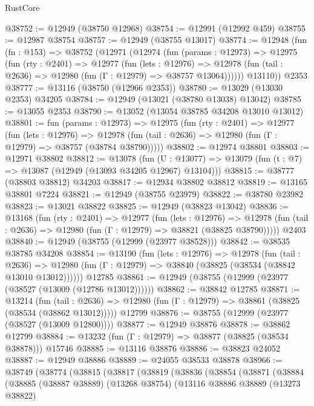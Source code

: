 \begin{lexlean}{RustCore}
\begin{coremodule}
@38752 := @12949 (@38750 @12968)
@38754 := @12991 (@12992 @459)
@38755 := @12987 @38754
@38757 := @12949 (@38755 @13017)
@38774 := @12948
    (fun (fn : @153) =>
    @38752
      (@12971
        (@12974
          (fun (params : @12973) =>
          @12975
            (fun (rty : @2401) =>
            @12977
              (fun (lets : @12976) =>
              @12978 (fun (tail : @2636) => @12980 (fun (Γ : @12979) => @38757 @13064))))))
        @13110))
    @2353
@38777 := @13116 (@38750 (@12966 @2353))
@38780 := @13029 (@13030 @2353) @34205
@38784 := @12949 (@13021 (@38780 @13038) @13042)
@38785 := @13055 @2353
@38790 := @13052 (@13054 @38785 @34208 @13010 @13012)
@38801 := fun (params : @12973) =>
  @12975
    (fun (rty : @2401) =>
    @12977
      (fun (lets : @12976) =>
      @12978 (fun (tail : @2636) => @12980 (fun (Γ : @12979) => @38757 (@38784 @38790)))))
@38802 := @12974 @38801
@38803 := @12971 @38802
@38812 := @13078
    (fun (U : @13077) => @13079 (fun (t : @7) => @13087 (@12949 (@13093 @34205 @12967) @13104)))
@38815 := @38777 (@38803 @38812) @34203
@38817 := @12934 @38802 @38812
@38819 := @13165 @38801 @7224
@38821 := @12949 (@38755 @23979)
@38822 := @38780 @23982
@38823 := @13021 @38822
@38825 := @12949 (@38823 @13042)
@38836 := @13168
    (fun (rty : @2401) =>
    @12977
      (fun (lets : @12976) =>
      @12978 (fun (tail : @2636) => @12980 (fun (Γ : @12979) => @38821 (@38825 @38790)))))
    @2403
@38840 := @12949 (@38755 (@12999 (@23977 @38528)))
@38842 := @38535 @38785 @34208
@38854 := @13190
    (fun (lets : @12976) =>
    @12978
      (fun (tail : @2636) =>
      @12980 (fun (Γ : @12979) => @38840 (@38825 (@38534 (@38842 @13010 @13012))))))
    @12785
@38861 := @12949 (@38755 (@12999 (@23977 (@38527 (@13009 (@12786 @13012))))))
@38862 := @38842 @12785
@38871 := @13214
    (fun (tail : @2636) => @12980 (fun (Γ : @12979) => @38861 (@38825 (@38534 (@38862 @13012)))))
    @12799
@38876 := @38755 (@12999 (@23977 (@38527 (@13009 @12800))))
@38877 := @12949 @38876
@38878 := @38862 @12799
@38884 := @13232 (fun (Γ : @12979) => @38877 (@38825 (@38534 @38878))) @15746
@38885 := @13116 @38876
@38886 := @38823 @24052
@38887 := @12949 @38886
@38889 := @24055 @38533 @38878
@38966 := @38749
    (@38774
      (@38815
        (@38817
          (@38819
            (@38836
              (@38854
                (@38871
                  (@38884
                    (@38885
                      (@38887 @38889)
                      (@13268 @38754)
                      (@13116
                        @38886
                        @38889
                        (@13273 @38822)

\end{coremodule}
\end{lexlean}
